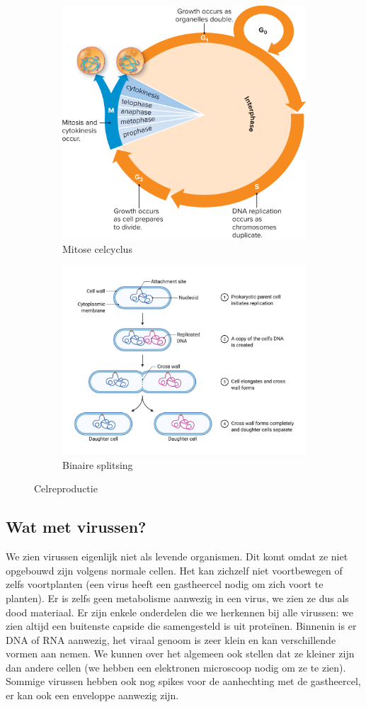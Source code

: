 \documentclass[a4paper,kul]{kulakarticle} %
\begin{document}
\begin{figure}[h]
	\centering
	\begin{subfigure}{.5\textwidth}
		\centering
		\includegraphics[width=0.7\linewidth]{Celcyclus}
		\caption{Mitose celcyclus}
		\label{fig:celcyclus}
	\end{subfigure}%
	\begin{subfigure}{.5\textwidth}
		\centering
		\includegraphics[width=0.7\linewidth]{Binaire_Splitsing}
		\caption[Splitsing]{Binaire splitsing}
		\label{fig:binairesplitsing}
	\end{subfigure}
	\caption{Celreproductie}
	\label{fig:reproductie}
\end{figure}
\newpage
\subsection{Wat met virussen?}
We zien virussen eigenlijk niet als levende organismen. Dit komt omdat ze niet opgebouwd zijn volgens normale cellen. Het kan zichzelf niet voortbewegen of zelfs voortplanten (een virus heeft een gastheercel nodig om zich voort te planten). Er is zelfs geen metabolisme aanwezig in een virus, we zien ze dus als dood materiaal. Er zijn enkele onderdelen die we herkennen bij alle virussen: we zien altijd een buitenste capside die samengesteld is uit proteïnen. Binnenin is er DNA of RNA aanwezig, het viraal genoom is zeer klein en kan verschillende vormen aan nemen. We kunnen over het algemeen ook stellen dat ze kleiner zijn dan andere cellen (we hebben een elektronen microscoop nodig om ze te zien). Sommige virussen hebben ook nog spikes voor de aanhechting met de gastheercel, er kan ook een enveloppe aanwezig zijn. 
\newpage
\end{document}
